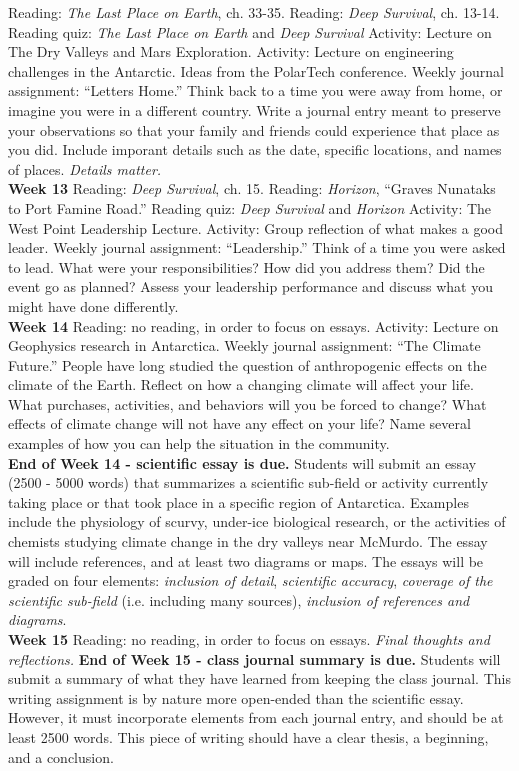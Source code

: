\documentclass[10pt]{article}
\begin{document}
\begin{outline}[enumerate]
\2 Reading: \textit{The Last Place on Earth}, ch. 33-35.
\2 Reading: \textit{Deep Survival}, ch. 13-14.
\2 Reading quiz: \textit{The Last Place on Earth} and \textit{Deep Survival}
\2 Activity: Lecture on The Dry Valleys and Mars Exploration.
\2 Activity: Lecture on engineering challenges in the Antarctic.  Ideas from the PolarTech conference.
\2 Weekly journal assignment: ``Letters Home.'' Think back to a time you were away from home, or imagine you were in a different country.  Write a journal entry meant to preserve your observations so that your family and friends could experience that place as you did.  Include imporant details such as the date, specific locations, and names of places.  \textit{Details matter.} \\
\1 \textbf{Week 13}
\2 Reading: \textit{Deep Survival}, ch. 15.
\2 Reading: \textit{Horizon}, ``Graves Nunataks to Port Famine Road.''
\2 Reading quiz: \textit{Deep Survival} and \textit{Horizon}
\2 Activity: The West Point Leadership Lecture.
\2 Activity: Group reflection of what makes a good leader.
\2 Weekly journal assignment: ``Leadership.'' Think of a time you were asked to lead.  What were your responsibilities?  How did you address them?  Did the event go as planned?  Assess your leadership performance and discuss what you might have done differently. \\
\1 \textbf{Week 14}
\2 Reading: no reading, in order to focus on essays.
\2 Activity: Lecture on Geophysics research in Antarctica.
\2 Weekly journal assignment: ``The Climate Future.'' People have long studied the question of anthropogenic effects on the climate of the Earth.  Reflect on how a changing climate will affect your life.  What purchases, activities, and behaviors will you be forced to change?  What effects of climate change will not have any effect on your life?  Name several examples of how you can help the situation in the community. \\
\2 \textbf{End of Week 14 - scientific essay is due.} Students will submit an essay (2500 - 5000 words) that summarizes a scientific sub-field or activity currently taking place or that took place in a specific region of Antarctica.  Examples include the physiology of scurvy, under-ice biological research, or the activities of chemists studying climate change in the dry valleys near McMurdo.  The essay will include references, and at least two diagrams or maps.  The essays will be graded on four elements: \textit{inclusion of detail}, \textit{scientific accuracy}, \textit{coverage of the scientific sub-field} (i.e. including many sources), \textit{inclusion of references and diagrams}. \\
\1 \textbf{Week 15}
\2 Reading: no reading, in order to focus on essays.
\2 \textit{Final thoughts and reflections.}
\2 \textbf{End of Week 15 - class journal summary is due.} Students will submit a summary of what they have learned from keeping the class journal.  This writing assignment is by nature more open-ended than the scientific essay.  However, it must incorporate elements from each journal entry, and should be at least 2500 words.  This piece of writing should have a clear thesis, a beginning, and a conclusion.
\end{outline}
\end{document}

